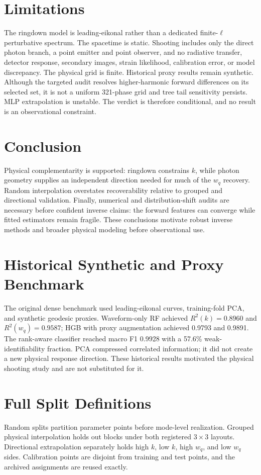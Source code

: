 \documentclass[11pt]{article}
\newcommand{\wq}{w_q}
\begin{document}
\section{Limitations}
The ringdown model is leading-eikonal rather than a dedicated finite-$\ell$
perturbative spectrum. The spacetime is static. Shooting includes only the
direct photon branch, a point emitter and point observer, and no radiative
transfer, detector response, secondary images, strain likelihood, calibration
error, or model discrepancy. The physical grid is finite. Historical proxy
results remain synthetic. Although the targeted audit resolves higher-harmonic
forward differences on its selected set, it is not a uniform 321-phase grid and
tree tail sensitivity persists. MLP extrapolation is unstable. The verdict is
therefore conditional, and no result is an observational constraint.

\section{Conclusion}
Physical complementarity is supported: ringdown constrains $k$, while photon
geometry supplies an independent direction needed for much of the $\wq$
recovery. Random interpolation overstates recoverability relative to grouped
and directional validation. Finally, numerical and distribution-shift audits
are necessary before confident inverse claims: the forward features can
converge while fitted estimators remain fragile. These conclusions motivate
robust inverse methods and broader physical modeling before observational use.

\clearpage
\appendix
\section{Historical Synthetic and Proxy Benchmark}
The original dense benchmark used leading-eikonal curves, training-fold PCA,
and synthetic geodesic proxies. Waveform-only RF achieved
$R^2(k)=0.8960$ and $R^2(\wq)=0.9587$; HGB with proxy augmentation achieved
0.9793 and 0.9891. The rank-aware classifier reached macro F1 0.9928 with a
57.6\% weak-identifiability fraction. PCA compressed correlated information; it
did not create a new physical response direction. These historical results
motivated the physical shooting study and are not substituted for it.

\section{Full Split Definitions}
Random splits partition parameter points before mode-level realization. Grouped
physical interpolation holds out blocks under both registered $3\times3$
layouts. Directional extrapolation separately holds high $k$, low $k$, high
$\wq$, and low $\wq$ sides. Calibration points are disjoint from training and
test points, and the archived assignments are reused exactly.
\end{document}
